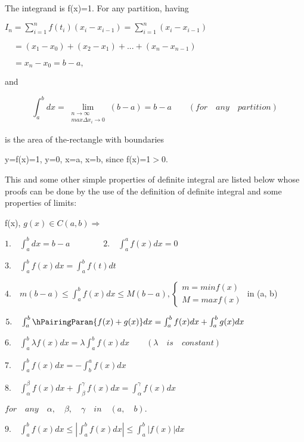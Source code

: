 \documentclass[11pts]{amsbook}
\begin{document}
	\begin{hSolution}
	The integrand is f(x)=1. For any partition, having
    
    $I_{n}=\sum_{i=1}^{n}f(t_{i})(x_{i}-x_{i-1})=\sum_{i=1}^{n}(x_{i}-x_{i-1})$
    
    $\quad=(x_{1}-x_{0})+(x_{2}-x_{1})+...+(x_{n}-x_{n-1})$
    
    $\quad=x_{n}-x_{0}=b-a,$
    
    and
    
    $$\int_{a}^{b}dx=\lim_{\substack{n\to\infty\\max\Delta x_{i}\to 0}}(b-a)=b-a \qquad (for\quad any\quad partition)$$
    
    is the area of the-rectangle with boundaries   
    
    \qquad \qquad y=f(x)=1, y=0, x=a, x=b, since f(x)=1$>$0.
    
    \qquad This and some other simple properties of definite integral are listed below whose proofs can be done by the use of the definition of definite integral and some properties of limits:
	\end{hSolution}
    \begin{hProperty}
    f(x), $g(x) \in C(a, b) \Longrightarrow$
    
    $1.\quad \int_{a}^{b}dx=b-a\qquad \qquad 2.\quad \int_{a}^{a}f(x)dx=0$
    
    $3.\quad \int_{a}^{b}f(x)dx=\int_{a}^{b}f(t)dt$
    
    $4.\quad m(b-a)\leq \int_{a}^{b}f(x)dx\leq M(b-a), 
    \begin{cases}
    m=minf(x) \\ M=maxf(x)
    \end{cases}$
    in (a, b)
    
    $5.\quad \int_{a}^{b}\hPairingParan{f(x)+g(x)}dx=\int_{a}^{b}f(x)dx+\int_{a}^{b}g(x)dx$
    
    $6.\quad \int_{a}^{b}\lambda f(x)dx=\lambda \int_{a}^{b}f(x)dx\qquad (\lambda \quad is \quad constant)$
    
    $7. \quad\int_{a}^{b}f(x)dx=-\int_{b}^{a}f(x)dx$
    
    $8.\quad \int_{\alpha}^{\beta}f(x)dx+\int_{\beta}^{\gamma}f(x)dx=\int_{\alpha}^{\gamma}f(x)dx$
    
    $for \quad any \quad \alpha,\quad \beta,\quad \gamma \quad in\quad (a,\quad b).$
    
    $9.\quad \int_{a}^{b}f(x)dx\leq \left|\int_{a}^{b}f(x)dx\right|\leq \int_{a}^{b}\left|f(x)\right|dx$
    \end{hProperty}
\end{document}

